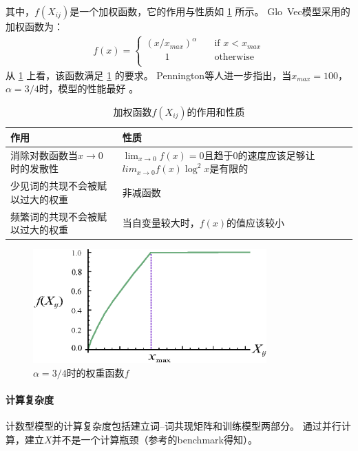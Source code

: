 其中，$f(X_{ij})$是一个加权函数，它的作用与性质如 \cref{tab:glove-weight-reasons} 所示。
Glo~Vec模型采用的加权函数为：
\begin{align}
  f(x) = \begin{cases}
    (x/x_{max})^\alpha \quad &\text{if } x < x_{max} \\
    \quad\quad 1 \quad &\text{otherwise} \\
  \end{cases}
  \label{eqn:glove-weight}
\end{align}
从 \cref{fig:glove-weight-fn} 上看，该函数满足 \cref{tab:glove-weight-reasons} 的要求。
Pennington等人进一步指出，当$x_{max} = 100$，$\alpha = 3/4$时，模型的性能最好
\cite{pennington2014glove}。

\begin{table}
  \centering
  \caption{加权函数$f(X_{ij})$的作用和性质}
  \label{tab:glove-weight-reasons}
  \begin{tabular}{m{}m{}}
    \toprule
    作用 & 性质 \\
    \midrule
    消除对数函数当$x \rightarrow 0$时的发散性 &
    $\lim_{x\rightarrow 0} f(x) = 0$且趋于0的速度应该足够让$lim_{x \rightarrow 0} f(x)\log^2x$是有限的 \\
    少见词的共现不会被赋以过大的权重 & 非减函数 \\
    频繁词的共现不会被赋以过大的权重 & 当自变量较大时，$f(x)$的值应该较小 \\
    \bottomrule
  \end{tabular}
\end{table}

\begin{figure}
  \includegraphics[width=0.8\textwidth]{figures/glove-weight.eps}
  \centering
  \caption{$\alpha=3/4$时的权重函数$f$}
  \label{fig:glove-weight-fn}
\end{figure}

\paragraph{计算复杂度}
计数型模型的计算复杂度包括建立词--词共现矩阵和训练模型两部分。
通过并行计算，建立$X$并不是一个计算瓶颈（参考\cite{DBLP:conf/eacl/LebretC14}的benchmark得知）。

